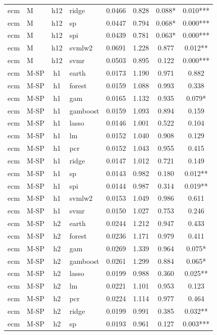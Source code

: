 \begin{ThreePartTable}
\begin{longtable}[t]{llclcccc}
ecm & M & h12 & ridge & 0.0466 & 0.828 & 0.088* & 0.010***\\
ecm & M & h12 & sp & 0.0447 & 0.794 & 0.068* & 0.000***\\
ecm & M & h12 & spi & 0.0439 & 0.781 & 0.063* & 0.000***\\
ecm & M & h12 & svmlw2 & 0.0691 & 1.228 & 0.877 & 0.012**\\
ecm & M & h12 & svmr & 0.0503 & 0.895 & 0.122 & 0.000***\\
\addlinespace
ecm & M-SP & h1 & earth & 0.0173 & 1.190 & 0.971 & 0.882\\
ecm & M-SP & h1 & forest & 0.0159 & 1.088 & 0.993 & 0.338\\
ecm & M-SP & h1 & gam & 0.0165 & 1.132 & 0.935 & 0.079*\\
ecm & M-SP & h1 & gamboost & 0.0159 & 1.093 & 0.894 & 0.159\\
ecm & M-SP & h1 & lasso & 0.0146 & 1.001 & 0.522 & 0.104\\
ecm & M-SP & h1 & lm & 0.0152 & 1.040 & 0.908 & 0.129\\
ecm & M-SP & h1 & pcr & 0.0152 & 1.043 & 0.955 & 0.415\\
ecm & M-SP & h1 & ridge & 0.0147 & 1.012 & 0.721 & 0.149\\
ecm & M-SP & h1 & sp & 0.0143 & 0.982 & 0.180 & 0.012**\\
ecm & M-SP & h1 & spi & 0.0144 & 0.987 & 0.314 & 0.019**\\
ecm & M-SP & h1 & svmlw2 & 0.0153 & 1.049 & 0.986 & 0.611\\
ecm & M-SP & h1 & svmr & 0.0150 & 1.027 & 0.753 & 0.246\\
\addlinespace
ecm & M-SP & h2 & earth & 0.0244 & 1.212 & 0.947 & 0.433\\
ecm & M-SP & h2 & forest & 0.0236 & 1.171 & 0.979 & 0.411\\
ecm & M-SP & h2 & gam & 0.0269 & 1.339 & 0.964 & 0.075*\\
ecm & M-SP & h2 & gamboost & 0.0261 & 1.299 & 0.884 & 0.065*\\
ecm & M-SP & h2 & lasso & 0.0199 & 0.988 & 0.360 & 0.025**\\
ecm & M-SP & h2 & lm & 0.0221 & 1.101 & 0.953 & 0.123\\
ecm & M-SP & h2 & pcr & 0.0224 & 1.114 & 0.977 & 0.464\\
ecm & M-SP & h2 & ridge & 0.0199 & 0.991 & 0.385 & 0.032**\\
ecm & M-SP & h2 & sp & 0.0193 & 0.961 & 0.127 & 0.003***\\

\end{longtable}
\end{ThreePartTable}
